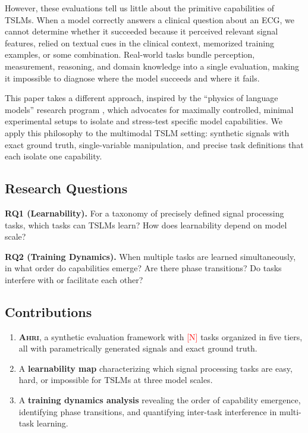 \documentclass[11pt]{article}
\newcommand{\ahri}{\textsc{Ahri}}
\newcommand{\placeholder}[1]{\textcolor{red}{[#1]}}
\begin{document}
However, these evaluations tell us little about the primitive capabilities of TSLMs. When a model correctly answers a clinical question about an ECG, we cannot determine whether it succeeded because it perceived relevant signal features, relied on textual cues in the clinical context, memorized training examples, or some combination. Real-world tasks bundle perception, measurement, reasoning, and domain knowledge into a single evaluation, making it impossible to diagnose where the model succeeds and where it fails.

This paper takes a different approach, inspired by the ``physics of language models'' research program \citep{allenzhu2023physics,allenzhu2024physics}, which advocates for maximally controlled, minimal experimental setups to isolate and stress-test specific model capabilities. We apply this philosophy to the multimodal TSLM setting: synthetic signals with exact ground truth, single-variable manipulation, and precise task definitions that each isolate one capability.

\subsection{Research Questions}

\textbf{RQ1 (Learnability).} For a taxonomy of precisely defined signal processing tasks, which tasks can TSLMs learn? How does learnability depend on model scale?

\textbf{RQ2 (Training Dynamics).} When multiple tasks are learned simultaneously, in what order do capabilities emerge? Are there phase transitions? Do tasks interfere with or facilitate each other?

\subsection{Contributions}

\begin{enumerate}[leftmargin=*]
    \item \textbf{\ahri{}}, a synthetic evaluation framework with \placeholder{N} tasks organized in five tiers, all with parametrically generated signals and exact ground truth.
    \item A \textbf{learnability map} characterizing which signal processing tasks are easy, hard, or impossible for TSLMs at three model scales.
    \item A \textbf{training dynamics analysis} revealing the order of capability emergence, identifying phase transitions, and quantifying inter-task interference in multi-task learning.
\end{enumerate}
\end{document}
